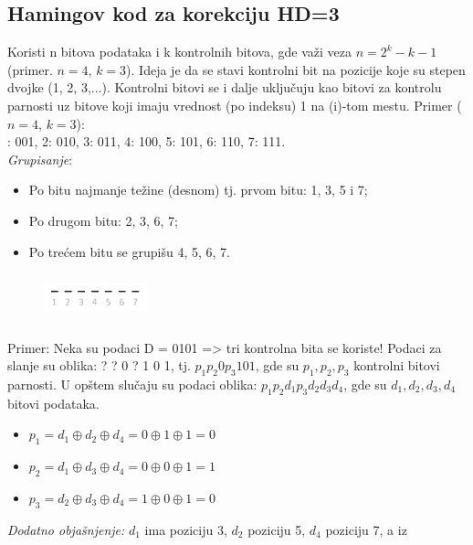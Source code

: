 \documentclass[a4paper]{article}
\begin{document}
    \subsection{Hamingov kod za korekciju HD=3}
        Koristi n bitova podataka i k kontrolnih bitova, gde važi veza $n = 2^k-k-1$ (primer. 
        $n=4$, $k=3$). Ideja je da se stavi kontrolni bit na pozicije koje su stepen dvojke (1, 2, 3,...).
        Kontrolni bitovi se i dalje uključuju kao bitovi za kontrolu parnosti uz bitove koji imaju
        vrednost (po indeksu) 1 na (i)-tom mestu. Primer ($n=4$, $k=3$): \\
        : 001, 2: 010, 3: 011, 4: 100, 5: 101, 6: 110, 7: 111. \\
        \textit{Grupisanje}:
        \begin{itemize}
            \item Po bitu najmanje težine (desnom) tj. prvom bitu: 1, 3, 5 i 7;
            \item Po drugom bitu: 2, 3, 6, 7;
            \item Po trećem bitu se grupišu 4, 5, 6, 7. 
        \end{itemize}
        \begin{figure}[H]
            \begin{center}
                \includegraphics[width=30mm,height=14mm]{Slike/haming1.png}
            \end{center}
        \end{figure}
        Primer: Neka su podaci D = 0101 => tri kontrolna bita se koriste! Podaci za slanje su oblika:
        ? ? 0 ? 1 0 1, tj. $p_1 p_2 0 p_3 1 0 1$, gde su $p_1, p_2, p_3$ kontrolni bitovi parnosti. U
        opštem slučaju su podaci oblika: $p_1 p_2 d_1 p_3 d_2 d_3 d_4$, gde su $d_1, d_2, d_3, d_4$ 
        bitovi podataka.
        \begin{itemize}
            \item $p_1 = d_1\oplus d_2\oplus d_4 = 0\oplus1\oplus1 = 0$
            \item $p_2 = d_1\oplus d_3\oplus d_4 = 0\oplus0\oplus1 = 1$
            \item $p_3 = d_2\oplus d_3\oplus d_4 = 1\oplus0\oplus1 = 0$
        \end{itemize}
        \textit{Dodatno objašnjenje:} $d_1$ ima poziciju 3, $d_2$ poziciju 5, $d_4$ poziciju 7, a iz 
\end{document}
